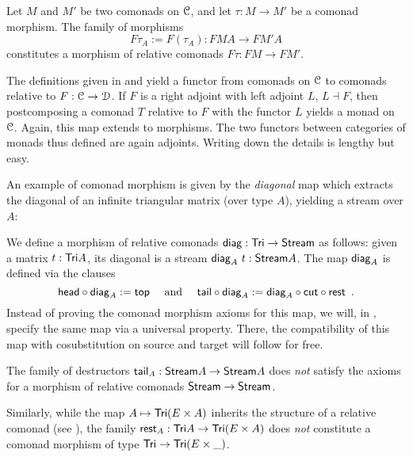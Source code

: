 \documentclass[a4paper,USenglish]{lipics}
\begin{document}
\begin{ex}\label{ex_relcom_from_com_morphism}
 Let $M$ and $M'$ be two comonads on ${\mathcal{C}}$, and let $\tau : M \to M'$ be a comonad morphism. 
 The family of morphisms \[F\tau_A := F(\tau_A) : FMA \to FM'A\] constitutes a morphism of 
 relative comonads $F\tau : FM\to FM'$.
\end{ex}


\begin{rem}
 The definitions given in  and  yield a functor from 
 comonads on ${\mathcal{C}}$ to comonads relative to $F:{\mathcal{C}}\to\mathcal{D}$. 
 If $F$ is a right adjoint with left adjoint $L$, $L\dashv F$, then postcomposing a comonad $T$ relative to $F$ with the functor $L$
 yields a monad on ${\mathcal{C}}$. Again, this map extends to morphisms.
 The two functors between categories of monads thus defined are again adjoints.
 Writing down the details is lengthy but easy.
\end{rem}



An example of comonad morphism is given by the \emph{diagonal} map which extracts the diagonal of an infinite triangular matrix (over type $A$),
yielding a stream over $A$:

\begin{ex}\label{ex_diag}
We define a morphism of relative comonads $\mathsf{diag} : \mathsf{Tri} \to \mathsf{Stream}$ as follows:
given a matrix $t : \mathsf{Tri} A$, its diagonal is a stream $\mathsf{diag}_A~t : \mathsf{Stream} A$.
The map $\mathsf{diag}_A$ is defined via the clauses
 \begin{equation*} \comp{\diagonal_A}{\shead} := \head \quad\text{ and } \quad %
                  \comp{\diagonal_A}{\stail} := \comp{\comp{\tail}{\cut}}{\diagonal_A} \enspace . %
 \end{equation*}
Instead of proving the comonad morphism axioms for this map, we will, in , specify the same map via a universal property. 
There, the compatibility of this map with 
cosubstitution on source and target will follow for free.



\end{ex}



\begin{rem}
 The family of destructors $\mathsf{tail}_A : \mathsf{Stream} A \to \mathsf{Stream} A$  
 does \emph{not} satisfy the axioms for a morphism of relative comonads $\mathsf{Stream}\to\mathsf{Stream}$.
 
 Similarly, while the map $A \mapsto \mathsf{Tri}(E\times A)$ inherits the structure of a relative comonad (see ),
 the family $\mathsf{rest}_A : \mathsf{Tri} A \to \mathsf{Tri}(E \times A)$  does \emph{not} constitute a comonad morphism
 of type $\mathsf{Tri} \to \mathsf{Tri}(E \times \_)$.
\end{rem}
\end{document}
